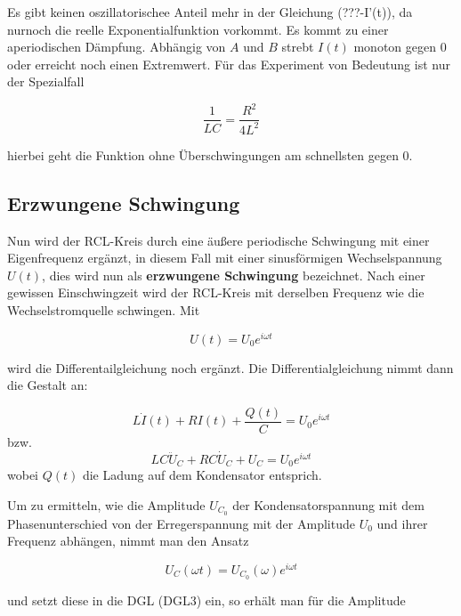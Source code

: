 \begin{itemize}
  Es gibt keinen oszillatorischee Anteil mehr in der Gleichung (???-I'(t)), da nurnoch die reelle
  Exponentialfunktion vorkommt. Es kommt zu einer aperiodischen Dämpfung. Abhängig von $A$ und $B$ strebt
  $I(t)$ monoton gegen 0 oder erreicht noch einen Extremwert. Für das Experiment von Bedeutung ist nur
  der Spezialfall

  \begin{equation*}
    \frac{1}{LC} = \frac{R^2}{4L^2}
  \end{equation*}

  hierbei geht die Funktion ohne Überschwingungen am schnellsten gegen 0.

\end{itemize}

\subsection{Erzwungene Schwingung}
Nun wird der RCL-Kreis durch eine äußere periodische Schwingung mit einer Eigenfrequenz ergänzt,
in diesem Fall mit einer sinusförmigen Wechselspannung $U(t)$, dies wird nun als \textbf{erzwungene Schwingung} bezeichnet.
Nach einer gewissen Einschwingzeit wird der RCL-Kreis mit derselben Frequenz wie die Wechselstromquelle schwingen.
Mit

\begin{equation*}
  U(t) = U_0 e^{i \omega t}
\end{equation*}

wird die Differentailgleichung noch ergänzt. Die Differentialgleichung nimmt dann die Gestalt an:

\begin{equation*}
  \label{DGL2}
  L \dot{I}(t) + R I(t) + \frac{Q(t)}{C} = U_0 e^{i \omega t}
\end{equation*}
 bzw.
 \begin{equation*}
   \label{DGL3}
   LC \ddot{U}_C + RC \dot{U}_C + U_C = U_0 e^{i \omega t}
 \end{equation*}
 wobei $Q(t)$ die Ladung auf dem Kondensator entsprich.

 Um zu ermitteln, wie die Amplitude $U_{C_0}$ der Kondensatorspannung mit dem Phasenunterschied von der Erregerspannung
 mit der Amplitude $U_0$ und ihrer Frequenz abhängen, nimmt man den Ansatz

 \begin{equation*}
   U_C(\omega t) = U_{C_0} (\omega) e^{i \omega t}
 \end{equation*}

 und setzt diese in die DGL (DGL3) ein, so erhält man für die Amplitude

